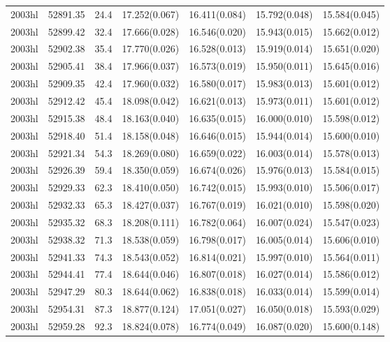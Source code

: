 \begin{table*}
\begin{tabular}{ccccccc}
2003hl	  & 52891.35	 & 24.4	& 17.252(0.067)	 & 16.411(0.084)	 & 15.792(0.048)	 & 15.584(0.045) \\ 
2003hl	  & 52899.42	 & 32.4	& 17.666(0.028)	 & 16.546(0.020)	 & 15.943(0.015)	 & 15.662(0.012) \\ 
2003hl	  & 52902.38	 & 35.4	& 17.770(0.026)	 & 16.528(0.013)	 & 15.919(0.014)	 & 15.651(0.020) \\ 
2003hl	  & 52905.41	 & 38.4	& 17.966(0.037)	 & 16.573(0.019)	 & 15.950(0.011)	 & 15.645(0.016) \\ 
2003hl	  & 52909.35	 & 42.4	& 17.960(0.032)	 & 16.580(0.017)	 & 15.983(0.013)	 & 15.601(0.012) \\ 
2003hl	  & 52912.42	 & 45.4	& 18.098(0.042)	 & 16.621(0.013)	 & 15.973(0.011)	 & 15.601(0.012) \\ 
2003hl	  & 52915.38	 & 48.4	& 18.163(0.040)	 & 16.635(0.015)	 & 16.000(0.010)	 & 15.598(0.012) \\ 
2003hl	  & 52918.40	 & 51.4	& 18.158(0.048)	 & 16.646(0.015)	 & 15.944(0.014)	 & 15.600(0.010) \\ 
2003hl	  & 52921.34	 & 54.3	& 18.269(0.080)	 & 16.659(0.022)	 & 16.003(0.014)	 & 15.578(0.013) \\ 
2003hl	  & 52926.39	 & 59.4	& 18.350(0.059)	 & 16.674(0.026)	 & 15.976(0.013)	 & 15.584(0.015) \\ 
2003hl	  & 52929.33	 & 62.3	& 18.410(0.050)	 & 16.742(0.015)	 & 15.993(0.010)	 & 15.506(0.017) \\ 
2003hl	  & 52932.33	 & 65.3	& 18.427(0.037)	 & 16.767(0.019)	 & 16.021(0.010)	 & 15.598(0.020) \\ 
2003hl	  & 52935.32	 & 68.3	& 18.208(0.111)	 & 16.782(0.064)	 & 16.007(0.024)	 & 15.547(0.023) \\ 
2003hl	  & 52938.32	 & 71.3	& 18.538(0.059)	 & 16.798(0.017)	 & 16.005(0.014)	 & 15.606(0.010) \\ 
2003hl	  & 52941.33	 & 74.3	& 18.543(0.052)	 & 16.814(0.021)	 & 15.997(0.010)	 & 15.564(0.011) \\ 
2003hl	  & 52944.41	 & 77.4	& 18.644(0.046)	 & 16.807(0.018)	 & 16.027(0.014)	 & 15.586(0.012) \\ 
2003hl	  & 52947.29	 & 80.3	& 18.644(0.062)	 & 16.838(0.018)	 & 16.033(0.014)	 & 15.599(0.014) \\ 
2003hl	  & 52954.31	 & 87.3	& 18.877(0.124)	 & 17.051(0.027)	 & 16.050(0.018)	 & 15.593(0.029) \\ 
2003hl	  & 52959.28	 & 92.3	& 18.824(0.078)	 & 16.774(0.049)	 & 16.087(0.020)	 & 15.600(0.148) \\ 

\end{tabular}
\end{table*}
